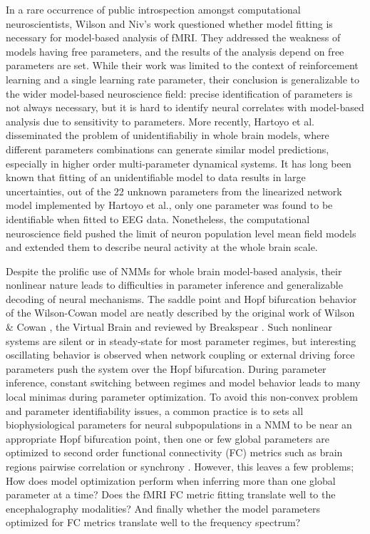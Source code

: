 In a rare occurrence of public introspection amongst computational neuroscientists, Wilson and Niv's work \cite{wilson_is_2015} questioned whether model fitting is necessary for model-based analysis of fMRI. They addressed the weakness of models having free parameters, and the results of the analysis depend on free parameters are set. While their work was limited to the context of reinforcement learning and a single learning rate parameter, their conclusion is generalizable to the wider model-based neuroscience field: precise identification of parameters is not always necessary, but it is hard to identify neural correlates with model-based analysis due to sensitivity to parameters. More recently, Hartoyo et al. \cite{hartoyo_parameter_2019} disseminated the problem of unidentifiabiliy in whole brain models, where different parameters combinations can generate similar model predictions, especially in higher order multi-parameter dynamical systems. It has long been known that fitting of an unidentifiable model to data results in large uncertainties, out of the 22 unknown parameters from the linearized network model implemented by Hartoyo et al., only one parameter was found to be identifiable when fitted to EEG data. Nonetheless, the computational neuroscience field pushed the limit of neuron population level mean field models and extended them to describe neural activity at the whole brain scale.

Despite the prolific use of NMMs for whole brain model-based analysis, their nonlinear nature leads to difficulties in parameter inference and generalizable decoding of neural mechanisms. The saddle point and Hopf bifurcation behavior of the Wilson-Cowan model are neatly described by the original work of Wilson \& Cowan \cite{Wilson1972}, the Virtual Brain \cite{sanz-leon_mathematical_2015} and reviewed by Breakspear \cite{breakspear_dynamic_2017}. Such nonlinear systems are silent or in steady-state for most parameter regimes, but interesting oscillating behavior is observed when network coupling or external driving force parameters push the system over the Hopf bifurcation. During parameter inference, constant switching between regimes and model behavior leads to many local minimas during parameter optimization. To avoid this non-convex problem and parameter identifiability issues, a common practice is to sets all biophysiological parameters for neural subpopulations in a NMM to be near an appropriate Hopf bifurcation point, then one or few global parameters are optimized to second order functional connectivity (FC) metrics such as brain regions pairwise correlation or synchrony \cite{Zimmermann2018, Deco2009, abeysuriya_biophysical_2018, wang_inversion_2019, demirtas_hierarchical_2019, honey_predicting_2009}. However, this leaves a few problems; How does model optimization perform when inferring more than one global parameter at a time? Does the fMRI FC metric fitting translate well to the encephalography modalities? And finally whether the model parameters optimized for FC metrics translate well to the frequency spectrum?

